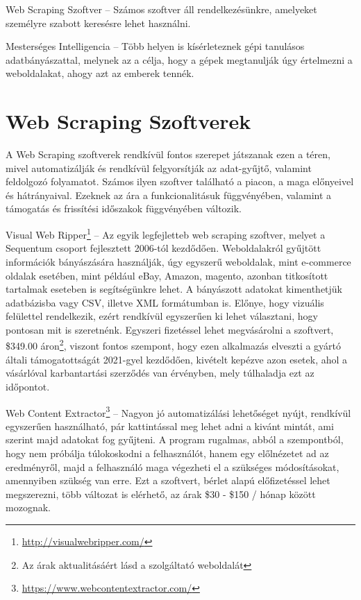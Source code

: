 Web Scraping Szoftver – Számos szoftver áll rendelkezésünkre, amelyeket személyre szabott keresésre lehet használni. 

Mesterséges Intelligencia – Több helyen is kísérleteznek gépi tanulásos adatbányászattal, melynek az a célja, hogy a gépek megtanulják úgy értelmezni a weboldalakat, ahogy azt az emberek tennék.

\section{Web Scraping Szoftverek}

A Web Scraping szoftverek rendkívül fontos szerepet játszanak ezen a téren, mivel automatizálják és rendkívül felgyorsítják az adat-gyűjtő, valamint feldolgozó folyamatot. Számos ilyen szoftver található a piacon, a maga előnyeivel és hátrányaival. Ezeknek az ára a funkcionalitásuk függvényében, valamint a támogatás és frissítési időszakok függvényében változik. 

Visual Web Ripper\footnote{\url{http://visualwebripper.com/}} – Az egyik legfejletteb web scraping szoftver, melyet a Sequentum csoport fejlesztett 2006-tól kezdődően. Weboldalakról gyűjtött információk bányászására használják, úgy egyszerű weboldalak, mint e-commerce oldalak esetében, mint például eBay, Amazon, magento, azonban titkosított tartalmak eseteben is segítségünkre lehet. A bányászott adatokat kimenthetjük adatbázisba vagy CSV, illetve XML formátumban is. Előnye, hogy vizuális felülettel rendelkezik, ezért rendkívül egyszerűen ki lehet választani, hogy pontosan mit is szeretnénk. Egyszeri fizetéssel lehet megvásárolni a szoftvert, \$349.00 áron\footnote{\label{price_disclaimer}Az árak aktualitásáért lásd a szolgáltató weboldalát}, viszont fontos szempont, hogy ezen alkalmazás elveszti a gyártó általi támogatottságát 2021-gyel kezdődően, kivételt kepézve azon esetek, ahol a vásárlóval karbantartási szerződés van érvényben, mely túlhaladja ezt az időpontot.

Web Content Extractor\footnote{\url{https://www.webcontentextractor.com/}} – Nagyon jó automatizálási lehetőséget nyújt, rendkívül egyszerűen használható, pár kattintással meg lehet adni a kivánt mintát, ami szerint majd adatokat fog gyűjteni. A program rugalmas, abból a szempontból, hogy nem próbálja túlokoskodni a felhasználót, hanem egy előlnézetet ad az eredményről, majd a felhasználó maga végezheti el a szükséges módosításokat, amennyiben szükség van erre. Ezt a szoftvert, bérlet alapú előfizetéssel lehet megszerezni, több változat is elérhető, az árak \$30 - \$150 / hónap között mozognak.

